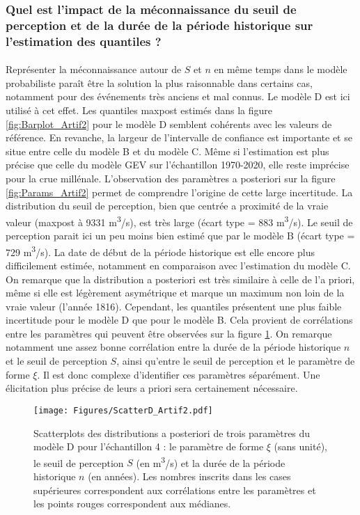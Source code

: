 \documentclass[11pt]{article}
\begin{document}
	\subsubsection{Quel est l'impact de la méconnaissance du seuil de perception et de la durée de la période historique sur l'estimation des quantiles ?}	
	
	\paragraph{} Représenter la méconnaissance autour de $S$ et $n$ en même temps dans le modèle probabiliste paraît être la solution la plus raisonnable dans certains cas, notamment pour des événements très anciens et mal connus. Le modèle D est ici utilisé à cet effet. Les quantiles maxpost estimés dans la figure \ref{fig:Barplot_Artif2} pour le modèle D semblent cohérents avec les valeurs de référence. En revanche, la largeur de l'intervalle de confiance est importante et se situe entre celle du modèle B et du modèle C. Même si l'estimation est plus précise que celle du modèle GEV sur l'échantillon 1970-2020, elle reste imprécise pour la crue millénale. L'observation des paramètres a posteriori sur la figure \ref{fig:Params_Artif2} permet de comprendre l'origine de cette large incertitude. La distribution du seuil de perception, bien que centrée a proximité de la vraie valeur (maxpost à 9331 m\textsuperscript{3}/s), est très large (écart type = 883 m\textsuperscript{3}/s). Le seuil de perception parait ici un peu moins bien estimé que par le modèle B (écart type = 729 m\textsuperscript{3}/s). La date de début de la période historique est elle encore plus difficilement estimée, notamment en comparaison avec l'estimation du modèle C. On remarque que la distribution a posteriori est très similaire à celle de l'a priori, même si elle est légèrement asymétrique et marque un maximum non loin de la vraie valeur (l'année 1816). Cependant, les quantiles présentent une plus faible incertitude pour le modèle D que pour le modèle B. Cela provient de corrélations entre les paramètres qui peuvent être observées sur la figure \ref{fig:ScatterD_Artif2}. On remarque notamment une assez bonne corrélation entre la durée de la période historique $n$ et le seuil de perception $S$, ainsi qu'entre le seuil de perception et le paramètre de forme $\xi$. Il est donc complexe d'identifier ces paramètres séparément. Une élicitation plus précise de leurs a priori sera certainement nécessaire.
	
	\begin{figure}[h]
		\centering
		\texttt{[image: Figures/ScatterD\_Artif2.pdf]}
		\caption{Scatterplots des distributions a posteriori de trois paramètres du modèle D pour l'échantillon 4 : le paramètre de forme $\xi$ (sans unité), le seuil de perception $S$ (en m\textsuperscript{3}/s) et la durée de la période historique $n$ (en années). Les nombres inscrits dans les cases supérieures correspondent aux corrélations entre les paramètres et les points rouges correspondent aux médianes.}
		\label{fig:ScatterD_Artif2}
	\end{figure}
		
\end{document}
